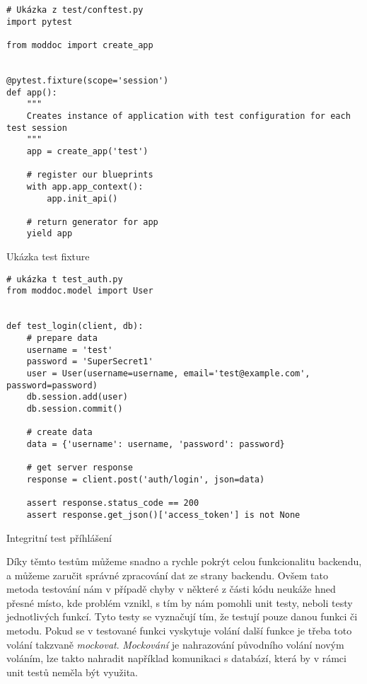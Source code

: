 \begin{listing}[h]
    \begin{verbatim}
# Ukázka z test/conftest.py
import pytest

from moddoc import create_app


@pytest.fixture(scope='session')
def app():
    """
    Creates instance of application with test configuration for each test session
    """
    app = create_app('test')

    # register our blueprints
    with app.app_context():
        app.init_api()

    # return generator for app
    yield app
    \end{verbatim}
    \caption{Ukázka test fixture}
    \label{lst:testFixture}
\end{listing}

\begin{listing}[h]
    \begin{verbatim}
# ukázka t test_auth.py
from moddoc.model import User


def test_login(client, db):
    # prepare data
    username = 'test'
    password = 'SuperSecret1'
    user = User(username=username, email='test@example.com', password=password)
    db.session.add(user)
    db.session.commit()

    # create data
    data = {'username': username, 'password': password}

    # get server response
    response = client.post('auth/login', json=data)

    assert response.status_code == 200
    assert response.get_json()['access_token'] is not None
    \end{verbatim}
    \caption{Integritní test příhlášení}
    \label{lst:authTest}
\end{listing}

Díky těmto testům můžeme snadno a rychle pokrýt celou funkcionalitu backendu, a můžeme zaručit správné zpracování dat ze strany backendu.
Ovšem tato metoda testování nám v případě chyby v některé z části kódu neukáže hned přesné místo, kde problém vznikl, s tím by nám pomohli
unit testy, neboli testy jednotlivých funkcí. Tyto testy se vyznačují tím, že testují pouze danou funkci či metodu. Pokud se v testované funkci
vyskytuje volání další funkce je třeba toto volání takzvaně \textit{mockovat}. \textit{Mockování} je nahrazování původního volání novým voláním,
lze takto nahradit například komunikaci s databází, která by v rámci unit testů neměla být využita.

